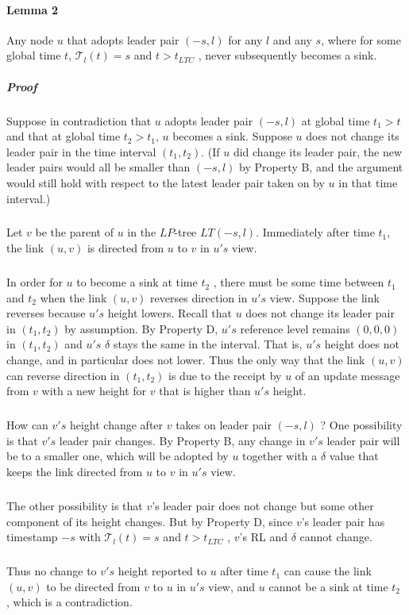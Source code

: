 \paragraph{Lemma 2}Any node $u$ that adopts leader pair $(-s, l)$ for any $l$ and any $s$, where for some global time $t$, $\mathcal{T}_l (t) = s$ and $t > t_{LTC}$ , never subsequently becomes a sink.
\subparagraph{Proof}Suppose in contradiction that $u$ adopts leader pair $(-s, l)$ at global time $t_1 > t$ and that at global time $t_2 > t_1$, $u$ becomes a sink. Suppose $u$ does not change its leader pair in the time interval $(t_1 ,t_2 )$. (If $u$ did change its leader pair, the new leader pairs would all be smaller than $(-s, l)$ by Property B, and the argument would still hold with respect to the latest leader pair taken on by $u$ in that time interval.)
\subparagraph{}Let $v$ be the parent of $u$ in the $LP$-tree $LT(-s, l)$. Immediately after time $t_1$, the link $(u, v)$ is directed from $u$ to $v$ in $u's$ view.
\subparagraph{}In order for $u$ to become a sink at time $t_2$ , there must be some time between $t_1$ and $t_2$ when the link $(u, v)$ reverses direction in $u's$ view. Suppose the link reverses because $u's$ height lowers. Recall that $u$ does not change its leader pair in $(t_1,t_2 )$ by assumption. By Property D, $u's$ reference level remains $(0, 0, 0)$ in $(t_1 ,t_2 )$ and $u's$ $\delta$ stays the same in the interval. That is, $u's$ height does not change, and in particular does not lower. Thus the only way that the link $(u, v)$ can reverse direction in $(t_1 ,t_2 )$ is due to the receipt by $u$ of an update message from $v$ with a new height for $v$ that is higher than $u's$ height.
\subparagraph{}How can $v's$ height change after $v$ takes on leader pair $(-s, l)$ ? One possibility is that $v's$ leader pair changes. By Property B, any change in $v's$ leader pair will be to a smaller one, which will be adopted by $u$ together with a $\delta$ value that keeps the link directed from $u$ to $v$ in $u's$ view.
\subparagraph{}The other possibility is that $v$'s leader pair does not change but some other component of its height changes. But by Property D, since $v$'s leader pair has timestamp $-s$ with $\mathcal{T} _l (t) = s$ and $t > t_{LTC}$ , $v$'s RL and $\delta$ cannot change.
\subparagraph{}Thus no change to $v's$ height reported to $u$ after time $t_1$ can cause the link $(u, v)$ to be directed from $v$ to $u$ in $u's$ view, and $u$ cannot be a sink at time $t_2$ , which is a contradiction.
